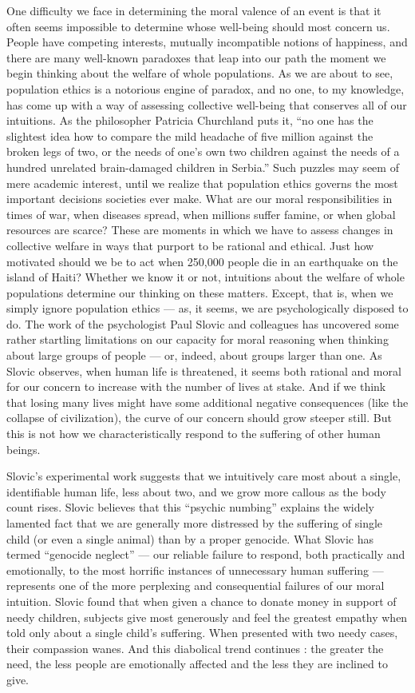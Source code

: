 \documentclass[a4paper,14pt]{extbook}
\begin{document}
One difficulty we face in determining the moral valence of an event is that it often seems impossible to determine whose well-being should most concern us.
People have competing interests, mutually incompatible notions of happiness, and there are many well-known paradoxes that leap into our path the moment we begin thinking about the welfare of whole populations.
As we are about to see, population ethics is a notorious engine of paradox, and no one, to my knowledge, has come up with a way of assessing collective well-being that conserves all of our intuitions.
As the philosopher Patricia Churchland puts it, ``no one has the slightest idea how to compare the mild headache of five million against the broken legs of two, or the needs of one's own two children against the needs of a hundred unrelated brain-damaged children in Serbia.''
Such puzzles may seem of mere academic interest, until we realize that population ethics governs the most important decisions societies ever make.
What are our moral responsibilities in times of war, when diseases spread, when millions suffer famine, or when global resources are scarce?
These are moments in which we have to assess changes in collective welfare in ways that purport to be rational and ethical.
Just how motivated should we be to act when 250,000 people die in an earthquake on the island of Haiti?
Whether we know it or not, intuitions about the welfare of whole populations determine our thinking on these matters.
Except, that is, when we simply ignore population ethics --- as, it seems, we are psychologically disposed to do.
The work of the psychologist Paul Slovic and colleagues has uncovered some rather startling limitations on our capacity for moral reasoning when thinking about large groups of people --- or, indeed, about groups larger than one.
As Slovic observes, when human life is threatened, it seems both rational and moral for our concern to increase with the number of lives at stake.
And if we think that losing many lives might have some additional negative consequences (like the collapse of civilization), the curve of our concern should grow steeper still.
But this is not how we characteristically respond to the suffering of other human beings.

Slovic's experimental work suggests that we intuitively care most about a single, identifiable human life, less about two, and we grow more callous as the body count rises.
Slovic believes that this ``psychic numbing'' explains the widely lamented fact that we are generally more distressed by the suffering of single child (or even a single animal) than by a proper genocide.
What Slovic has termed ``genocide neglect'' --- our reliable failure to respond, both practically and emotionally, to the most horrific instances of unnecessary human suffering --- represents one of the more perplexing and consequential failures of our moral intuition.
Slovic found that when given a chance to donate money in support of needy children, subjects give most generously and feel the greatest empathy when told only about a single child's suffering.
When presented with two needy cases, their compassion wanes.
And this diabolical trend continues :
the greater the need, the less people are emotionally affected and the less they are inclined to give.
\end{document}
